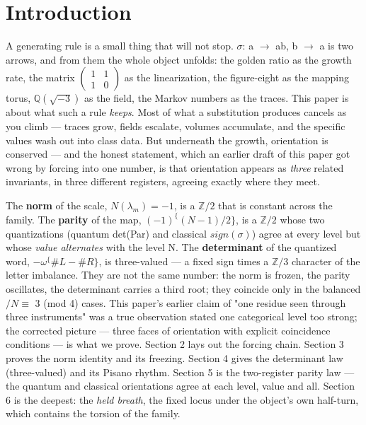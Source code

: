 \documentclass[11pt]{article}
\theoremstyle{plain}
\theoremstyle{definition}
\theoremstyle{remark}
\begin{document}
\section{Introduction}

A generating rule is a small thing that will not stop. \(\sigma \): a \(\to \) ab, b \(\to \) a is two arrows, and from them the whole object unfolds: the golden ratio as the growth rate, the matrix \(\left(\begin{smallmatrix}1 & 1\\1 & 0\end{smallmatrix}\right)\) as the linearization, the figure-eight as the mapping torus, \(\mathbb{Q}(\sqrt{-3})\) as the field, the Markov numbers as the traces. This paper is about what such a rule \emph{keeps}. Most of what a substitution produces cancels as you climb — traces grow, fields escalate, volumes accumulate, and the specific values wash out into class data. But underneath the growth, orientation is conserved — and the honest statement, which an earlier draft of this paper got wrong by forcing into one number, is that orientation appears as \emph{three} related invariants, in three different registers, agreeing exactly where they meet.

The \textbf{norm} of the scale, \(N(\lambda _{m}) = -1\), is a \(\mathbb{Z}/2\) that is constant across the family. The \textbf{parity} of the map, \((-1)^\{(N-1)/2\}\), is a \(\mathbb{Z}/2\) whose two quantizations (quantum det(Par) and classical \(sign(\sigma )\)) agree at every level but whose \emph{value alternates} with the level N. The \textbf{determinant} of the quantized word, \(-\omega ^\{\#L-\#R\}\), is three-valued — a fixed sign times a \(\mathbb{Z}/3\) character of the letter imbalance. They are not the same number: the norm is frozen, the parity oscillates, the determinant carries a third root; they coincide only in the balanced \(/ N \equiv \) 3 (mod 4) cases. This paper's earlier claim of "one residue seen through three instruments" was a true observation stated one categorical level too strong; the corrected picture — three faces of orientation with explicit coincidence conditions — is what we prove. Section 2 lays out the forcing chain. Section 3 proves the norm identity and its freezing. Section 4 gives the determinant law (three-valued) and its Pisano rhythm. Section 5 is the two-register parity law — the quantum and classical orientations agree at each level, value and all. Section 6 is the deepest: the \emph{held breath}, the fixed locus under the object's own half-turn, which contains the torsion of the family.
\end{document}
